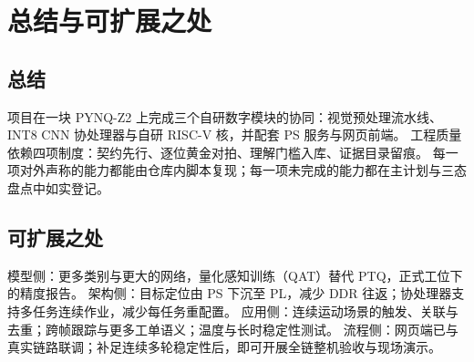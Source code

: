 \section{总结与可扩展之处}
\label{sec:conclusion}

\subsection{总结}
项目在一块 PYNQ-Z2 上完成三个自研数字模块的协同：视觉预处理流水线、INT8 CNN 协处理器与自研 RISC-V 核，并配套 PS 服务与网页前端。
工程质量依赖四项制度：契约先行、逐位黄金对拍、理解门槛入库、证据目录留痕。
每一项对外声称的能力都能由仓库内脚本复现；每一项未完成的能力都在主计划与三态盘点中如实登记。

\subsection{可扩展之处}
模型侧：更多类别与更大的网络，量化感知训练（QAT）替代 PTQ，正式工位下的精度报告。
架构侧：目标定位由 PS 下沉至 PL，减少 DDR 往返；协处理器支持多任务连续作业，减少每任务重配置。
应用侧：连续运动场景的触发、关联与去重；跨帧跟踪与更多工单语义；温度与长时稳定性测试。
流程侧：网页端已与真实链路联调；补足连续多轮稳定性后，即可开展全链整机验收与现场演示。
